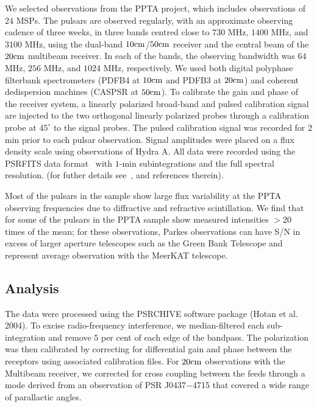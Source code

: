 \documentclass[useAMS,usenatbib]{mn2e}
\begin{document}
We selected observations from the PPTA project, which includes observations 
of $24$ MSPs. 
%
The pulsars are observed regularly, with an approximate observing cadence of 
three weeks, in three bands centred close to $730$ MHz, $1400$ MHz, and $3100$ 
MHz, using the dual-band $10\rm{cm}$/$50\rm{cm}$ receiver and the central beam 
of the $20\rm{cm}$ multibeam receiver. In each of the bands, the observing 
bandwidth was $64$ MHz, $256$ MHz, and $1024$ MHz, respectively. 
%
We used both digital polyphase filterbank spectrometers (PDFB4 at $10\rm{cm}$ 
and PDFB3 at $20\rm{cm}$) and coherent dedispersion machines (CASPSR at $50\rm{cm}$). 
%
To calibrate the gain and phase of the receiver system, a linearly polarized 
broad-band and pulsed calibration signal are injected to the two orthogonal 
linearly polarized probes through a calibration probe at $45^{\circ}$ to the 
signal probes. The pulsed calibration signal was recorded for $2$ min prior to 
each pulsar observation.
%
Signal amplitudes were placed on a flux density scale using observations of 
Hydra A.
%
All data were recorded using the PSRFITS data format~\citep{Hotan04} with 
$1$-min subintegrations and the full spectral resolution.
%
(for futher details see~\citet{Manchester13}, and references therein). 
%

Most of the pulsars in the sample show large flux variability at the PPTA 
observing frequencies due to diffractive and refractive scintillation. 
We find that for some of the pulsars in the PPTA sample show measured intensities 
$> 20$ times of the mean; for these observations, Parkes observations can have S/N 
in excess of larger aperture telescopes such as the Green Bank Telescope and 
represent average observation with the MeerKAT telescope.
%


\subsection{Analysis}

The data were processed using the PSRCHIVE software package (Hotan et al. 2004). 
To excise radio-frequency interference, we median-filtered each sub-integration 
and remove $5$ per cent of each edge of the bandpass.
%
The polarization was then calibrated by correcting for differential gain and 
phase between the receptors using associated calibration files.
%
For $20\rm{cm}$ observations with the Multibeam receiver, we corrected for 
cross coupling between the feeds through a mode derived from an observation of 
PSR J0437$-$4715 that covered a wide range of parallactic angles.
%
\end{document}

